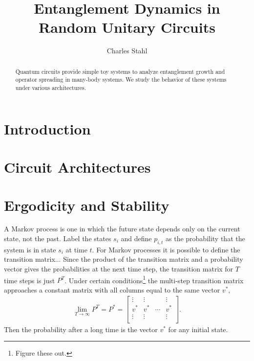 \documentclass[11pt]{article}
\begin{document}
\title{Entanglement Dynamics in Random Unitary Circuits}
\author{Charles Stahl}

\maketitle

\begin{abstract}
	Quantum circuits provide simple toy systems to analyze entanglement growth and operator spreading in many-body systems. We study the behavior of these systems under various architectures.
\end{abstract}

\tableofcontents

\newpage

\section{Introduction} \label{sec:intro}

\section{Circuit Architectures} \label{sec:arch}

\section{Ergodicity and Stability} \label{sec:erg}

A Markov process is one in which the future state depends only on the current state, not the past. Label the states $s_i$ and define $p_{i,t}$ as the probability that the system is in state $s_i$ at time $t$. For Markov processes it is possible to define the transition matrix... Since the product of the transition matrix and a probability vector gives the probabilities at the next time step, the transition matrix for $T$ time steps is just $P^T$. Under certain conditions\footnote{Figure these out.} the multi-step transition matrix approaches a constant matrix with all columns equal to the same vector $v^*$,
\begin{align}
\lim\limits_{T\to \infty}P^T = P^* = \begin{bmatrix}
\vdots & \vdots &  & \vdots\\
v^* & v^* & \cdots & v^*\\
\vdots & \vdots &  & \vdots\\
\end{bmatrix}.
\end{align}
Then the probability after a long time is the vector $v^*$ for any initial state.
\end{document}
